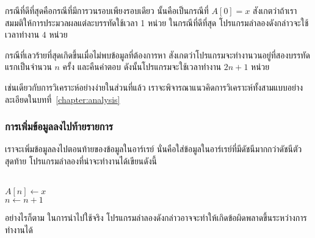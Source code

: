 กรณี{\wbr}ที่{\wbr}ดี{\wbr}ที่สุด{\wbr}คือ{\wbr}กรณี{\wbr}ที่{\wbr}มี{\wbr}การ{\wbr}วน{\wbr}รอบ{\wbr}เพียง{\wbr}รอบ{\wbr}เดียว นั้น{\wbr}คือ{\wbr}เป็น{\wbr}กรณี{\wbr}ที่ $A[0] = x$
สังเกต{\wbr}ว่า{\wbr}ถ้า{\wbr}เรา{\wbr}สมมติ{\wbr}ให้การ{\wbr}ประมวล{\wbr}ผล{\wbr}แต่ละ{\wbr}บรรทัด{\wbr}ใช้{\wbr}เวลา 1 หน่วย ใน{\wbr}กรณี{\wbr}ที่{\wbr}ดี{\wbr}ที่สุด{\wbr}
โปรแกรม{\wbr}ลำลอง{\wbr}ดัง{\wbr}กล่าว{\wbr}จะ{\wbr}ใช้{\wbr}เวลา{\wbr}ทำงาน $4$ หน่วย{\wbr}

กรณี{\wbr}ที่{\wbr}เลว{\wbr}ร้าย{\wbr}ที่สุด{\wbr}เกิด{\wbr}ขึ้น{\wbr}เมื่อ{\wbr}ไม่{\wbr}พบ{\wbr}ข้อมูล{\wbr}ที่{\wbr}ต้องการ{\wbr}หา{\wbr}
สังเกต{\wbr}ว่า{\wbr}โปรแกรม{\wbr}จะ{\wbr}ทำงาน{\wbr}วน{\wbr}อยู่{\wbr}ที่{\wbr}สอง{\wbr}บรรทัด{\wbr}แรก{\wbr}เป็น{\wbr}จำนวน $n$ ครั้ง และ{\wbr}คืน{\wbr}คำ{\wbr}ตอบ{\wbr}
ดังนั้น{\wbr}โปรแกรม{\wbr}จะ{\wbr}ใช้{\wbr}เวลา{\wbr}ทำงาน $2n + 1$ หน่วย{\wbr}

เช่น{\wbr}เดียว{\wbr}กับ{\wbr}การ{\wbr}วิเคราะห์{\wbr}อย่าง{\wbr}ง่าย{\wbr}ใน{\wbr}ส่วน{\wbr}ที่{\wbr}แล้ว{\wbr}
เรา{\wbr}จะ{\wbr}พิจารณา{\wbr}แนวคิด{\wbr}การ{\wbr}วิเคราะห์{\wbr}ทั้ง{\wbr}สาม{\wbr}แบบอย่าง{\wbr}ละเอียด{\wbr}ใน{\wbr}บท{\wbr}ที่~\ref{chapter:analysis}

\subsubsection{การ{\wbr}เพิ่ม{\wbr}ข้อมูล{\wbr}ลง{\wbr}ไป{\wbr}ท้าย{\wbr}รายการ}

เรา{\wbr}จะ{\wbr}เพิ่ม{\wbr}ข้อมูล{\wbr}ลง{\wbr}ไป{\wbr}ตอน{\wbr}ท้าย{\wbr}ของ{\wbr}ข้อมูล{\wbr}ใน{\wbr}อาร์{\wbr}เรย์
นั่น{\wbr}คือ{\wbr}ใส่{\wbr}ข้อมูล{\wbr}ใน{\wbr}อาร์{\wbr}เรย์{\wbr}ที่{\wbr}มี{\wbr}ดัชนี{\wbr}มาก{\wbr}กว่า{\wbr}ดัชนี{\wbr}ตัว{\wbr}สุดท้าย{\wbr}
โปรแกรม{\wbr}ลำลอง{\wbr}ที่{\wbr}น่า{\wbr}จะ{\wbr}ทำงาน{\wbr}ได้{\wbr}เขียน{\wbr}ดังนี้{\wbr}

\begin{algt}
\\
\hspace*{0.2in} $A[n] \leftarrow x$\\
\hspace*{0.2in} $n \leftarrow n + 1$
\end{algt}

อย่างไร{\wbr}ก็{\wbr}ตาม ใน{\wbr}การ{\wbr}นำ{\wbr}ไป{\wbr}ใช้{\wbr}จริง โปรแกรม{\wbr}ลำลอง{\wbr}ดัง{\wbr}กล่าว{\wbr}อาจ{\wbr}จะ{\wbr}ทำให้{\wbr}เกิด{\wbr}ข้อ{\wbr}ผิดพลาด{\wbr}ขึ้น{\wbr}ระหว่าง{\wbr}การ{\wbr}ทำงาน{\wbr}ได้{\wbr}

